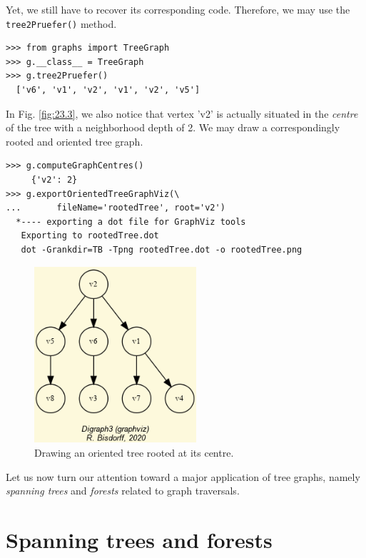 Yet, we still have to recover its corresponding \Pruefer code. Therefore, we may use the \texttt{tree2Pruefer()} method.
\begin{lstlisting}
>>> from graphs import TreeGraph
>>> g.__class__ = TreeGraph
>>> g.tree2Pruefer()
  ['v6', 'v1', 'v2', 'v1', 'v2', 'v5']
\end{lstlisting}

In Fig. \ref{fig:23.3}, we also notice that vertex 'v2' is actually situated in the \emph{centre} of the tree with a neighborhood depth of 2. We may draw a correspondingly rooted and oriented tree graph.
\begin{lstlisting}
>>> g.computeGraphCentres()
     {'v2': 2}
>>> g.exportOrientedTreeGraphViz(\
...       fileName='rootedTree', root='v2')
  *---- exporting a dot file for GraphViz tools
   Exporting to rootedTree.dot
   dot -Grankdir=TB -Tpng rootedTree.dot -o rootedTree.png
\end{lstlisting}
\begin{figure}[h]
\sidecaption
\includegraphics[width=6cm]{Figures/rootedTree.png}
\caption{Drawing an oriented tree rooted at its centre.} 
\label{fig:23.4}       %
\end{figure}

Let us now turn our attention toward a major application of tree graphs, namely \emph{spanning trees} and \emph{forests} related to graph traversals.

\section{Spanning trees and forests}
\label{sec:23.2}

